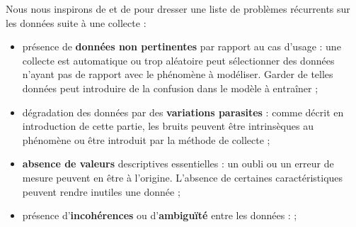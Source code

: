 			Nous nous inspirons de \cite{maharana-etal:2022:review-data-preprocessing} et de \cite{alasadi-bhaya:2017:review-data-preprocessing} pour dresser une liste de problèmes récurrents sur les données suite à une collecte :
			\begin{itemize}
				\item présence de \textbf{données non pertinentes} par rapport au cas d'usage : une collecte est automatique ou trop aléatoire peut sélectionner des données n'ayant pas de rapport avec le phénomène à modéliser. Garder de telles données peut introduire de la confusion dans le modèle à entraîner ;
				\item dégradation des données par des \textbf{variations parasites} : comme décrit en introduction de cette partie, les bruits peuvent être intrinsèques au phénomène ou être introduit par la méthode de collecte ;
				\item \textbf{absence de valeurs} descriptives essentielles : un oubli ou un erreur de mesure peuvent en être à l'origine. L'absence de certaines caractéristiques peuvent rendre inutiles une donnée ;
				\item présence d'\textbf{incohérences} ou d'\textbf{ambiguïté} entre les données :  ;
			\end{itemize}
